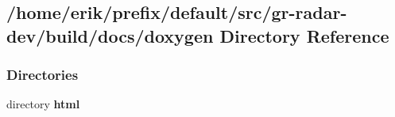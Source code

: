 \subsection{/home/erik/prefix/default/src/gr-\/radar-\/dev/build/docs/doxygen Directory Reference}
\label{dir_2b8d10877966e54ff0d689df7348d3dc}
\subsubsection*{Directories}
\begin{DoxyCompactItemize}
\item 
directory {\bf html}
\end{DoxyCompactItemize}
